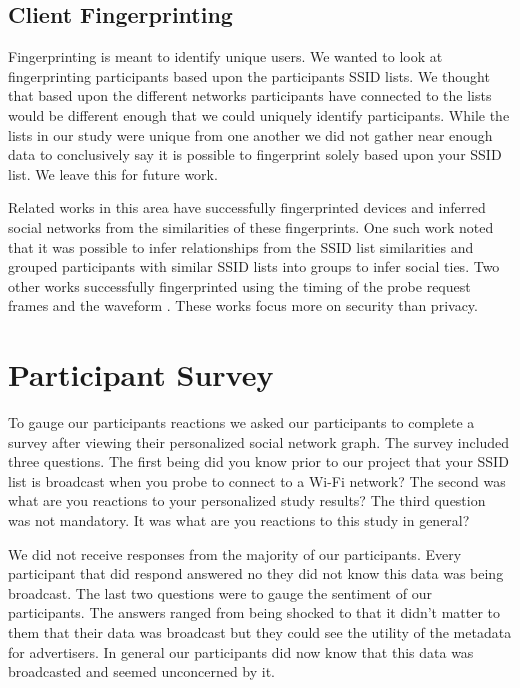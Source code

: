 \documentclass[letterpaper,twocolumn,10pt]{article}
\begin{document}
\subsection{Client Fingerprinting}

Fingerprinting is meant to identify unique users. We wanted to look at fingerprinting participants based upon the participants SSID lists. We thought that based upon the different networks participants have connected to the lists would be different enough that we could uniquely identify participants. While the lists in our study were unique from one another we did not gather near enough data to conclusively say it is possible to fingerprint solely based upon your SSID list. We leave this for future work.

Related works in this area have successfully fingerprinted devices and inferred social networks from the similarities of these fingerprints. One such work noted that it was possible to infer relationships from the SSID list similarities and grouped participants with similar SSID lists into groups to infer social ties\cite{cunche}. Two other works successfully fingerprinted using the timing of the probe request frames \cite{desmond} and the waveform \cite{ureten}. These works focus more on security than privacy.


\section{Participant Survey}


To gauge our participants reactions we asked our participants to complete a survey after viewing their personalized social network graph. The survey included three questions. The first being did you know prior to our project that your SSID list is broadcast when you probe to connect to a Wi-Fi network? The second was what are you reactions to your personalized study results? The third question was not mandatory. It was what are you reactions to this study in general?

 We did not receive responses from the majority of our participants. Every participant that did respond answered no they did not know this data was being broadcast. The last two questions were to gauge the sentiment of our participants. The answers ranged from being shocked to that it didn't matter to them that their data was broadcast but they could see the utility of the metadata for advertisers. In general our participants did now know that this data was broadcasted and seemed unconcerned by it.
\end{document}
